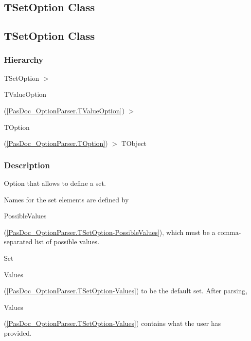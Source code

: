 \documentclass{report}
\begin{document}
\subsection*{\large{\textbf{TSetOption Class}}\normalsize\hspace{1ex}\hrulefill}
\else
\subsection*{TSetOption Class}
\fi
\label{PasDoc_OptionParser.TSetOption}
\subsubsection*{\large{\textbf{Hierarchy}}\normalsize\hspace{1ex}\hfill}
TSetOption {$>$} \begin{ttfamily}TValueOption\end{ttfamily}(\ref{PasDoc_OptionParser.TValueOption}) {$>$} \begin{ttfamily}TOption\end{ttfamily}(\ref{PasDoc_OptionParser.TOption}) {$>$} 
TObject
\subsubsection*{\large{\textbf{Description}}\normalsize\hspace{1ex}\hfill}
Option that allows to define a set.

Names for the set elements are defined by \begin{ttfamily}PossibleValues\end{ttfamily}(\ref{PasDoc_OptionParser.TSetOption-PossibleValues}), which must be a comma{-}separated list of possible values.

Set \begin{ttfamily}Values\end{ttfamily}(\ref{PasDoc_OptionParser.TSetOption-Values}) to be the default set. After parsing, \begin{ttfamily}Values\end{ttfamily}(\ref{PasDoc_OptionParser.TSetOption-Values}) contains what the user has provided.
\end{document}
